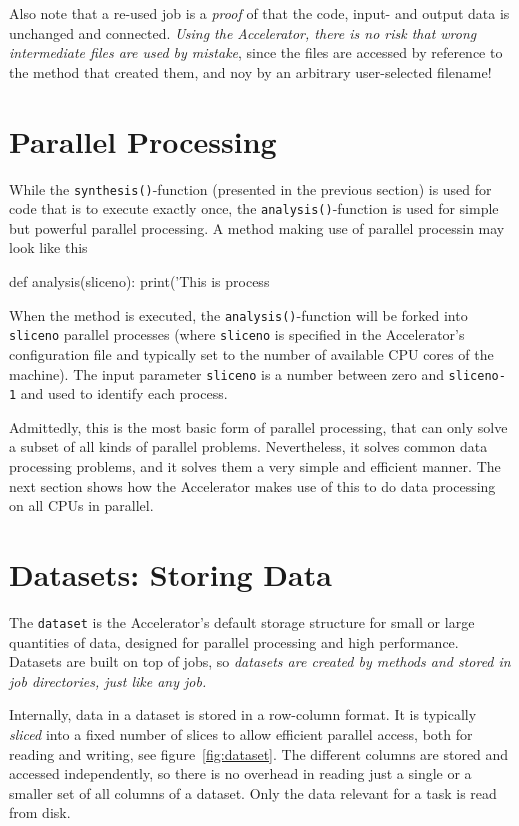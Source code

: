 Also note that a re-used job is a \emph{proof} of that the code,
input- and output data is unchanged and connected.  \emph{Using the
Accelerator, there is no risk that wrong intermediate files are used
by mistake}, since the files are accessed by reference to the method
that created them, and noy by an arbitrary user-selected filename!


\section{Parallel Processing}

While the \texttt{synthesis()}-function (presented in the previous
section) is used for code that is to execute exactly once, the
\texttt{analysis()}-function is used for simple but powerful parallel
processing.  A method making use of parallel processin may look like
this
\begin{python}
def analysis(sliceno):
    print('This is process %
\end{python}
When the method is executed, the \texttt{analysis()}-function will be
forked into \texttt{sliceno} parallel processes (where
\texttt{sliceno} is specified in the Accelerator's configuration file
and typically set to the number of available CPU cores of the
machine).  The input parameter \texttt{sliceno} is a number between
zero and \texttt{sliceno-1} and used to identify each process.

Admittedly, this is the most basic form of parallel processing, that
can only solve a subset of all kinds of parallel problems.
Nevertheless, it solves common data processing problems, and it solves
them a very simple and efficient manner.  The next section shows how
the Accelerator makes use of this to do data processing on all CPUs in
parallel.




\section{Datasets: Storing Data}

The \texttt{dataset} is the Accelerator's default storage structure
for small or large quantities of data, designed for parallel
processing and high performance.  Datasets are built on top of jobs,
so \emph{datasets are created by methods and stored in job
directories, just like any job.}

Internally, data in a dataset is stored in a row-column format.  It is
typically \emph{sliced} into a fixed number of slices to allow
efficient parallel access, both for reading and writing, see
figure~\ref{fig:dataset}. The different columns are stored and
accessed independently, so there is no overhead in reading just a
single or a smaller set of all columns of a dataset.  Only the data
relevant for a task is read from disk.

